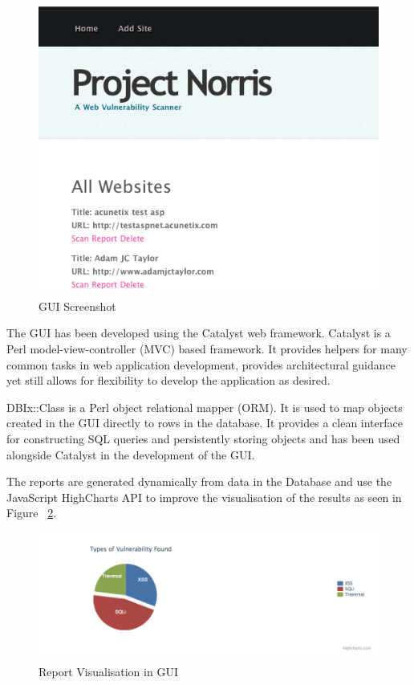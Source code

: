 \documentclass[12pt,a4paper]{article}
\begin{document}
\begin{figure}[!ht]
    \begin{center}
        \includegraphics{images/gui.png}    
    \end{center}
    \caption{GUI Screenshot}
    \label{fig:gui}
\end{figure}

The GUI has been developed using the Catalyst web framework.  Catalyst is a Perl model-view-controller (MVC) based framework.  It provides helpers for many common tasks in web application development, provides architectural guidance yet still allows for flexibility to develop the application as desired.

DBIx::Class is a Perl object relational mapper (ORM).  It is used to map objects created in the GUI directly to rows in the database.  It provides a clean interface for constructing SQL queries and persistently storing objects and has been used alongside Catalyst in the development of the GUI.

The reports are generated dynamically from data in the Database and use the JavaScript HighCharts API to improve the visualisation of the results as seen in Figure ~\ref{fig:report}.

\begin{figure}[!ht]
    \begin{center}
        \includegraphics[scale=0.7]{images/report.png}    
    \end{center}
    \caption{Report Visualisation in GUI}
    \label{fig:report}
\end{figure}
\end{document}
